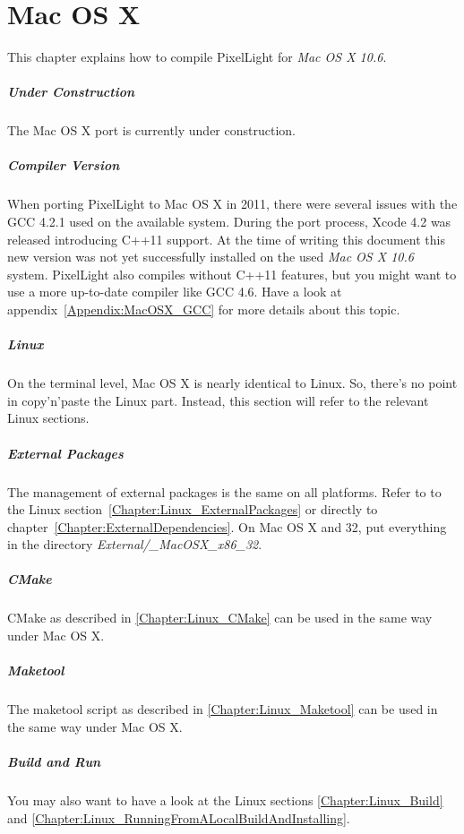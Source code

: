 \chapter{Mac OS X}
This chapter explains how to compile PixelLight for \emph{Mac OS X 10.6}.


\paragraph{Under Construction}
The Mac OS X port is currently under construction.


\paragraph{Compiler Version}
When porting PixelLight to Mac OS X in 2011, there were several issues with the \ac{GCC} 4.2.1 used on the available system. During the port process, Xcode 4.2 was released introducing C++11 support. At the time of writing this document this new version was not yet successfully installed on the used \emph{Mac OS X 10.6} system. PixelLight also compiles without C++11 features, but you might want to use a more up-to-date compiler like \ac{GCC} 4.6. Have a look at appendix~\ref{Appendix:MacOSX_GCC} for more details about this topic.


\paragraph{Linux}
On the terminal level, Mac OS X is nearly identical to Linux. So, there's no point in copy'n'paste the Linux part. Instead, this section will refer to the relevant Linux sections.


\paragraph{External Packages}
The management of external packages is the same on all platforms. Refer to to the Linux section~\ref{Chapter:Linux_ExternalPackages} or directly to chapter~\ref{Chapter:ExternalDependencies}. On Mac OS X and \SI{32}{\bit}, put everything in the directory \emph{External/\_MacOSX\_x86\_32}.


\paragraph{CMake}
CMake as described in \ref{Chapter:Linux_CMake} can be used in the same way under Mac OS X.


\paragraph{Maketool}
The maketool script as described in \ref{Chapter:Linux_Maketool} can be used in the same way under Mac OS X.


\paragraph{Build and Run}
You may also want to have a look at the Linux sections \ref{Chapter:Linux_Build} and \ref{Chapter:Linux_RunningFromALocalBuildAndInstalling}.
